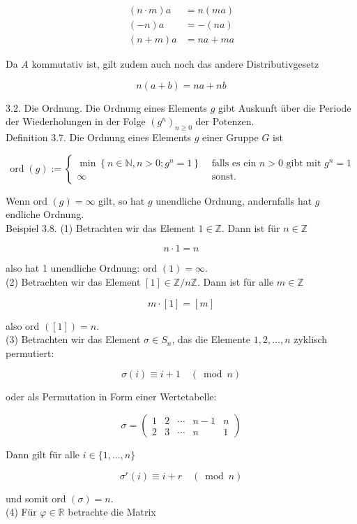 \documentclass[10pt, letterpaper]{article}
\begin{document}
$$
\begin{aligned}
(n \cdot m) a & =n(m a) \\
(-n) a & =-(n a) \\
(n+m) a & =n a+m a
\end{aligned}
$$

Da $A$ kommutativ ist, gilt zudem auch noch das andere Distributivgesetz

$$
n(a+b)=n a+n b
$$

3.2. Die Ordnung. Die Ordnung eines Elements $g$ gibt Auskunft über die Periode der Wiederholungen in der Folge $\left(g^{n}\right)_{n \geq 0}$ der Potenzen.\\
Definition 3.7. Die Ordnung eines Elements $g$ einer Gruppe $G$ ist

$$
\operatorname{ord}(g):= \begin{cases}\min \left\{n \in \mathbb{N}, n>0 ; g^{n}=1\right\} & \text { falls es ein } n>0 \text { gibt mit } g^{n}=1 \\ \infty & \text { sonst. }\end{cases}
$$

Wenn ord $(g)=\infty$ gilt, so hat $g$ unendliche Ordnung, andernfalls hat $g$ endliche Ordnung.\\
Beispiel 3.8. (1) Betrachten wir das Element $1 \in \mathbb{Z}$. Dann ist für $n \in \mathbb{Z}$

$$
n \cdot 1=n
$$

also hat 1 unendliche Ordnung: ord $(1)=\infty$.\\
(2) Betrachten wir das Element $[1] \in \mathbb{Z} / n \mathbb{Z}$. Dann ist für alle $m \in \mathbb{Z}$

$$
m \cdot[1]=[m]
$$

also ord $([1])=n$.\\
(3) Betrachten wir das Element $\sigma \in S_{n}$, das die Elemente $1,2, \ldots, n$ zyklisch permutiert:

$$
\sigma(i) \equiv i+1 \quad(\bmod n)
$$

oder als Permutation in Form einer Wertetabelle:

$$
\sigma=\left(\begin{array}{ccccc}
1 & 2 & \cdots & n-1 & n \\
2 & 3 & \cdots & n & 1
\end{array}\right)
$$

Dann gilt für alle $i \in\{1, \ldots, n\}$

$$
\sigma^{r}(i) \equiv i+r \quad(\bmod n)
$$

und somit ord $(\sigma)=n$.\\
(4) Für $\varphi \in \mathbb{R}$ betrachte die Matrix
\end{document}
